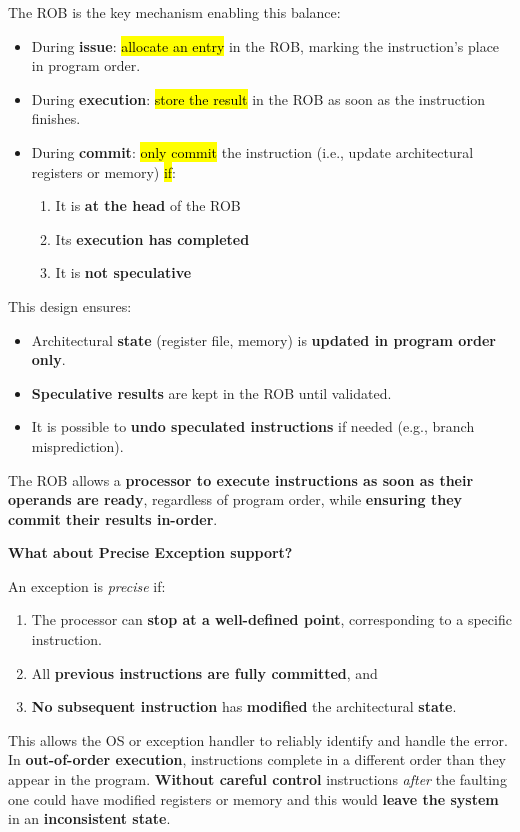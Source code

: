 \highspace
The ROB is the key mechanism enabling this balance:
\begin{itemize}
    \item During \textbf{issue}: \hl{allocate an entry} in the ROB, marking the instruction's place in program order.
    \item During \textbf{execution}: \hl{store the result} in the ROB as soon as the instruction finishes.
    \item During \textbf{commit}: \hl{only commit} the instruction (i.e., update architectural registers or memory) \hl{if}:
    \begin{enumerate}
        \item It is \textbf{at the head} of the ROB
        \item Its \textbf{execution has completed}
        \item It is \textbf{not speculative}
    \end{enumerate}
\end{itemize}
This design ensures:
\begin{itemize}[label=\textcolor{Green3}{}]
    \item Architectural \textbf{state} (register file, memory) is \textbf{updated in program order only}.
    \item \textbf{Speculative results} are kept in the ROB until validated.
    \item It is possible to \textbf{undo speculated instructions} if needed (e.g., branch misprediction).
\end{itemize}
The ROB allows a \textbf{processor to execute instructions as soon as their operands are ready}, regardless of program order, while \textbf{ensuring they commit their results in-order}.

\highspace
\begin{flushleft}
    \textcolor{Green3}{ \textbf{What about Precise Exception support?}}
\end{flushleft}
An exception is \emph{precise} if:
\begin{enumerate}
    \item The processor can \textbf{stop at a well-defined point}, corresponding to a specific instruction.
    \item All \textbf{previous instructions are fully committed}, and
    \item \textbf{No subsequent instruction} has \textbf{modified} the architectural \textbf{state}.
\end{enumerate}
This allows the OS or exception handler to reliably identify and handle the error. In \textbf{out-of-order execution}, instructions complete in a different order than they appear in the program. \textbf{Without careful control} instructions \emph{after} the faulting one could have modified registers or memory and this would \textbf{leave the system} in an \textbf{inconsistent state}.

